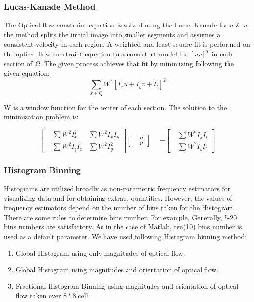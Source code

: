 \subsubsection{Lucas-Kanade Method}
The Optical flow constraint equation is solved using the Lucas-Kanade for $u$ \& $v$, the method splits the initial image into smaller segments and assumes a consistent velocity in each region.
A weighted and least-square fit is performed on the optical flow constraint equation to a consistent model for $[u  v]^T$ in each section of $\Omega$.
The given process achieves that fit by minimizing following the given equation:
\[\sum_{x \in Q} W^2 [I_xu + I_yv + I_t]^2\]

W is a window function for the center of each section. The solution to the minimization problem is:

\[\begin{bmatrix} & \sum W^2I_x^2 & \sum W^2I_xI_y \\
& \sum W^2I_yI_x & \sum W^2I_y^2 \end {bmatrix}\begin{bmatrix} & u\\ & v\end{bmatrix} = -\begin{bmatrix} & \sum W^2I_xI_t \\
& \sum W^2I_yI_t \end{bmatrix}\]


\subsubsection{Histogram Binning}
Histograms are utilized broadly as non-parametric frequency estimators for visualizing data and for obtaining extract quantities. However, the values of frequency estimators depend on the number of bins taken for the Histogram. There are some rules to determine bins number. For example, Generally, 5-20 bins numbers are satisfactory. As in the case of Matlab, ten(10) bins number is used as a default parameter.
We have used following Histogram binning method:

\begin{enumerate}
    \item Global Histogram using only magnitudes of optical flow.
    \item Global Histogram using magnitudes and orientation of optical flow.
    \item Fractional Histogram Binning using magnitudes and orientation of     optical flow taken over $8 \ast 8$ cell.
\end{enumerate}
    

